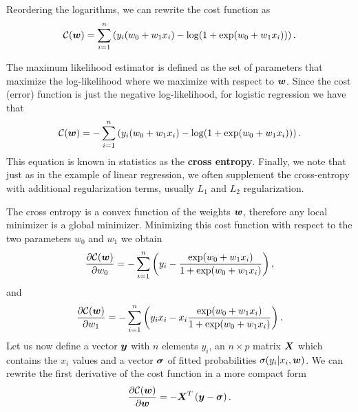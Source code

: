\noindent Reordering the logarithms, we can rewrite the cost function as
\begin{equation}
	\mathcal{C}({\boldsymbol{w}}) = \sum_{i=1}^n  \left(y_i(w_0+w_1x_i) -\log(1+\exp(w_0+w_1x_i))\right).
\end{equation}

\noindent The maximum likelihood estimator is defined as the set of parameters 
that maximize the log-likelihood where we maximize with respect to ${\boldsymbol{w}}$.
Since the cost (error) function is just the negative log-likelihood, for logistic 
regression we have that
\begin{equation}\label{eq:cross-entropy}
	\mathcal{C}({\boldsymbol{w}})=-\sum_{i=1}^n  \left(y_i(w_0+w_1x_i) -\log(1+\exp(w_0+w_1x_i))\right).
\end{equation}
This equation is known in statistics as the \textbf{cross entropy}.
Finally, we note that just as in the example of linear regression,
we often supplement the cross-entropy with additional regularization terms, 
usually $L_1$ and $L_2$ regularization.

The cross entropy is a convex function of the weights ${\boldsymbol{w}}$, therefore any
local minimizer is a global minimizer. Minimizing this cost function with respect 
to the two parameters $w_0$ and $w_1$ we obtain
\begin{equation}
	\frac{\partial \mathcal{C}({\boldsymbol{w}})}{\partial w_0} = -\sum_{i=1}^n  \left(y_i -\frac{\exp(w_0+w_1x_i)}{1+\exp(w_0+w_1x_i)}\right),
\end{equation}
and 
\begin{equation}
	\frac{\partial \mathcal{C}({\boldsymbol{w}})}{\partial w_1} = -\sum_{i=1}^n  \left(y_ix_i -x_i\frac{\exp(w_0+w_1x_i)}{1+\exp(w_0+w_1x_i)}\right).
\end{equation}
Let us now define a vector ${\boldsymbol{y}}$ with $n$ elements $y_i$, an
$n\times p$ matrix ${\boldsymbol{X}}$ which contains the $x_i$ values and a
vector ${\boldsymbol{\sigma}}$ of fitted probabilities $\sigma(y_i\vert x_i,{\boldsymbol{w}})$.
We can rewrite the first derivative of the cost function in a more compact form
\begin{equation}
	\frac{\partial \mathcal{C}({\boldsymbol{w}})}{\partial {\boldsymbol{w}}} = -{\boldsymbol{X}}^T\left({\boldsymbol{y}}-{\boldsymbol{\sigma}}\right). 
\end{equation}

